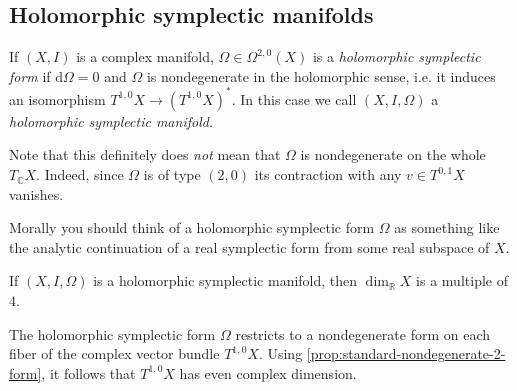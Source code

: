 \documentclass[12pt,letterpaper,reqno]{article}
\numberwithin{equation}{section}
\newcommand{\R}{\ensuremath{\mathbb R}}
\newcommand{\C}{\ensuremath{\mathbb C}}
\newcommand{\de}{\mathrm{d}}
\newcommand{\ti}[1]{\textit{#1}}
\begin{document}
\subsection{Holomorphic symplectic manifolds}

\begin{defn} If $(X,I)$ is a complex manifold, 
$\Omega \in \Omega^{2,0}(X)$ is a \ti{holomorphic
symplectic form} if $\de \Omega = 0$
and $\Omega$ is nondegenerate
in the holomorphic sense, i.e. it induces
an isomorphism $T^{1,0}X \to (T^{1,0} X)^*$.
In this case we call $(X,I,\Omega)$ a \ti{holomorphic symplectic
manifold}.
\end{defn}
Note that this definitely does \ti{not} mean that $\Omega$ is nondegenerate on the whole $T_\C X$. Indeed, since $\Omega$ is 
of type $(2,0)$ its contraction with any $v \in T^{0,1} X$ vanishes.

Morally you should think of a holomorphic symplectic form $\Omega$
as something like the analytic continuation of a real 
symplectic form from some real subspace of $X$.

\begin{prop} 
\label{prop:hol-symp-dimension-4n} If $(X,I,\Omega)$ is a holomorphic symplectic manifold,
then $\dim_\R X$ is a multiple of $4$.
\end{prop} 
\begin{pf} The holomorphic symplectic form $\Omega$ restricts to a nondegenerate form on each fiber of the complex vector 
bundle $T^{1,0} X$.
Using \autoref{prop:standard-nondegenerate-2-form}, it follows
that $T^{1,0} X$ has even complex dimension.
\end{pf}
\end{document}
